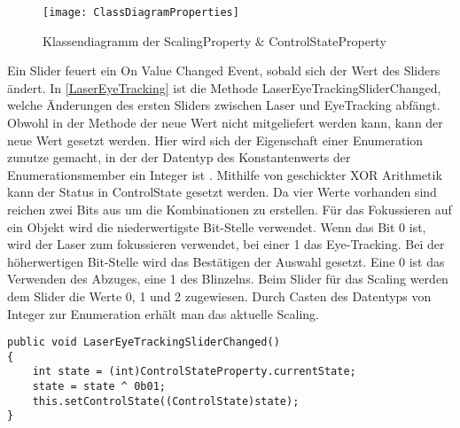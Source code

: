 \begin{figure}[!htbp]
	\centering
	\texttt{[image: ClassDiagramProperties]}
	\caption[Klassendiagramm der ScalingProperty \& ControlStateProperty]{Klassendiagramm der ScalingProperty \& ControlStateProperty}
	\label{fig:ClassDiagrammProperties}
\end{figure}

Ein Slider feuert ein On Value Changed Event, sobald sich der Wert des Sliders ändert. In \autoref{LaserEyeTracking} ist die Methode LaserEyeTrackingSliderChanged, welche Änderungen des ersten Sliders zwischen Laser und EyeTracking abfängt. Obwohl in der Methode der neue Wert nicht mitgeliefert werden kann, kann der neue Wert gesetzt werden. Hier wird sich der Eigenschaft einer Enumeration zunutze gemacht, in der der Datentyp des Konstantenwerts der Enumerationsmember ein Integer ist \cite{BillWagner.2020}. Mithilfe von geschickter XOR Arithmetik kann der Status in ControlState gesetzt werden. Da vier Werte vorhanden sind reichen zwei Bits aus um die Kombinationen zu erstellen. Für das Fokussieren auf ein Objekt wird die niederwertigste Bit-Stelle verwendet. Wenn das Bit 0 ist, wird der Laser zum fokussieren verwendet, bei einer 1 das Eye-Tracking. Bei der höherwertigen Bit-Stelle wird das Bestätigen der Auswahl gesetzt. Eine 0 ist das Verwenden des Abzuges, eine 1 des Blinzelns. Beim Slider für das Scaling werden dem Slider die Werte 0, 1 und 2 zugewiesen. Durch Casten  des Datentyps von Integer zur Enumeration erhält man das aktuelle Scaling.

\begin{lstlisting}[caption=Method LaserEyeTrackingSliderChanged,label=LaserEyeTracking]
public void LaserEyeTrackingSliderChanged()
{
    int state = (int)ControlStateProperty.currentState;
    state = state ^ 0b01;
    this.setControlState((ControlState)state);
}
\end{lstlisting}

